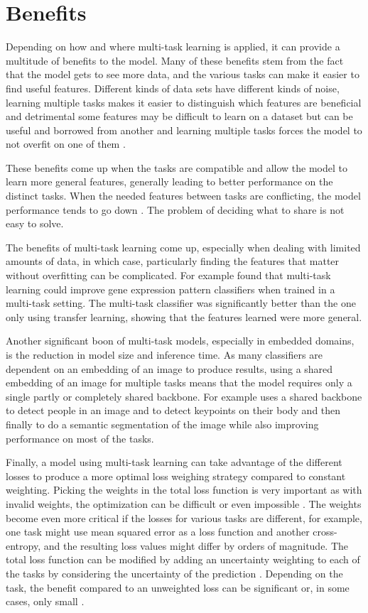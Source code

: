 \section{Benefits}
Depending on how and where multi-task learning is applied, it can provide a multitude of benefits to the model.
Many of these benefits stem from the fact that the model gets to see more data, and the various tasks can make it easier to find useful features.
Different kinds of data sets have different kinds of noise, learning multiple tasks makes it easier to distinguish which features are beneficial and detrimental some features may be difficult to learn on a dataset but can be useful and borrowed from another and learning multiple tasks forces the model to not overfit on one of them \citep{ruderOverview}.

These benefits come up when the tasks are compatible and allow the model to learn more general features, generally leading to better performance on the distinct tasks. 
When the needed features between tasks are conflicting, the model performance tends to go down \citep{uberNet}.
The problem of deciding what to share is not easy to solve.

The benefits of multi-task learning come up, especially when dealing with limited amounts of data, in which case, particularly finding the features that matter without overfitting can be complicated. 
For example \citep{biologicalMultitask} found that multi-task learning could improve gene expression pattern classifiers when trained in a multi-task setting. 
The multi-task classifier was significantly better than the one only using transfer learning, showing that the features learned were more general.

Another significant boon of multi-task models, especially in embedded domains, is the reduction in model size and inference time. 
As many classifiers are dependent on an embedding of an image to produce results, using a shared embedding of an image for multiple tasks means that the model requires only a single partly or completely shared backbone. 
For example \citep{multiPoseNet} uses a shared backbone to detect people in an image and to detect keypoints on their body and then finally to do a semantic segmentation of the image while also improving performance on most of the tasks.

Finally, a model using multi-task learning can take advantage of the different losses to produce a more optimal loss weighing strategy compared to constant weighting. 
Picking the weights in the total loss function is very important as with invalid weights, the optimization can be difficult or even impossible \citep{lossWeighting}. 
The weights become even more critical if the losses for various tasks are different, for example, one task might use mean squared error as a loss function and another cross-entropy, and the resulting loss values might differ by orders of magnitude.
The total loss function can be modified by adding an uncertainty weighting to each of the tasks by considering the uncertainty of the prediction \citep{usingUncertaintyToWeighLosses}. 
Depending on the task, the benefit compared to an unweighted loss can be significant \citep{usingUncertaintyToWeighLosses} or, in some cases, only small \citep{lossWeighting}.

